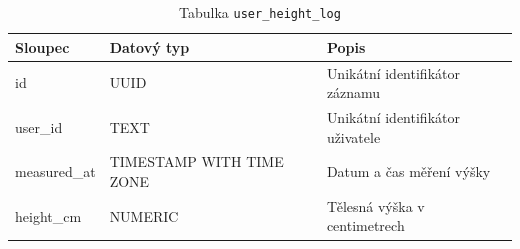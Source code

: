 \begin{table}[ht!]
    \centering
    \begin{tabularx}{\textwidth}{|l|l|L|}
        \hline
        \textbf{Sloupec} & \textbf{Datový typ}      & \textbf{Popis}                   \\ \hline
        id               & UUID                     & Unikátní identifikátor záznamu   \\ \hline
        user\_id         & TEXT                     & Unikátní identifikátor uživatele \\ \hline
        measured\_at     & TIMESTAMP WITH TIME ZONE & Datum a čas měření výšky         \\ \hline
        height\_cm       & NUMERIC                  & Tělesná výška v centimetrech     \\ \hline
    \end{tabularx}
    \caption{Tabulka \texttt{user\_height\_log}}
    \label{tab:user_height_log}
\end{table}
